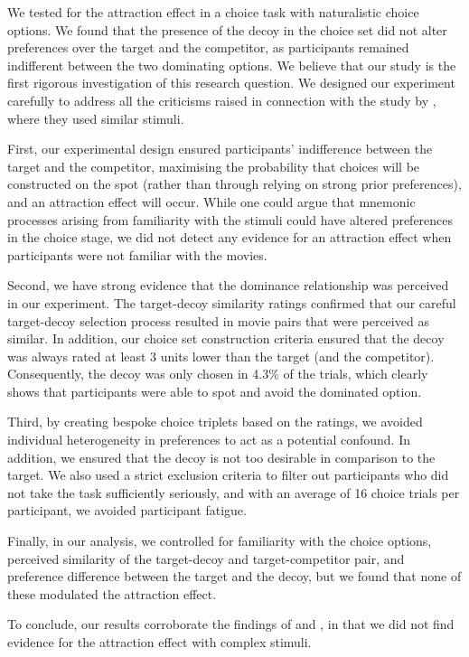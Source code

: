 \documentclass[12pt, a4paper]{article}
\begin{document}
We tested for the attraction effect in a choice task with naturalistic choice options. We found that the presence of the decoy in the choice set did not alter preferences over the target and the competitor, as participants remained indifferent between the two dominating options. We believe that our study is the first rigorous investigation of this research question. We designed our experiment carefully to address all the criticisms raised in connection with the study by \citeauthor{Frederick2014}, where they used similar stimuli.

First, our experimental design ensured participants' indifference between the target and the competitor, maximising the probability that choices will be constructed on the spot (rather than through relying on strong prior preferences), and an attraction effect will occur. While one could argue that mnemonic processes arising from familiarity with the stimuli could have altered preferences in the choice stage, we did not detect any evidence for an attraction effect when participants were not familiar with the movies.

Second, we have strong evidence that the dominance relationship was perceived in our experiment. The target-decoy similarity ratings confirmed that our careful target-decoy selection process resulted in movie pairs that were perceived as similar. In addition, our choice set construction criteria ensured that the decoy was always rated at least 3 units lower than the target (and the competitor). Consequently, the decoy was only chosen in 4.3\% of the trials, which clearly shows that participants were able to spot and avoid the dominated option.

Third, by creating bespoke choice triplets based on the ratings, we avoided individual heterogeneity in preferences to act as a potential confound. In addition, we ensured that the decoy is not too desirable in comparison to the target. We also used a strict exclusion criteria to filter out participants who did not take the task sufficiently seriously, and with an average of 16 choice trials per participant, we avoided participant fatigue.


Finally, in our analysis, we controlled for familiarity with the choice options, perceived similarity of the target-decoy and target-competitor pair, and preference difference between the target and the decoy, but we found that none of these modulated the attraction effect.


To conclude, our results corroborate the findings of \citeauthor{Frederick2014} and \citeauthor{Yang2014}, in that we did not find evidence for the attraction effect with complex stimuli.
\end{document}
